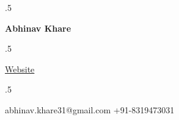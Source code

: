 \documentclass[margin, 7pt]{res} %
\begin{document}

\moveleft.5\hoffset\centerline{\huge\bf Abhinav Khare}%

 
\moveleft.5\hoffset\centerline{ \href{https://github.com/CosmicCoder96}{\faGithub} \hspace{0.1cm}\textbullet \hspace{0.1cm}\href{https://abhinavkhare.me}{Website}\hspace{0.1cm}\textbullet \hspace{0.1cm}\href{https://www.linkedin.com/in/abhinav-khare-a4444213a/}{\faLinkedin}}
\moveleft.5\hoffset\centerline{ abhinav.khare31@gmail.com\hspace{0.1cm} \textbullet \hspace{0.1cm}+91-8319473031}
\end{document}

